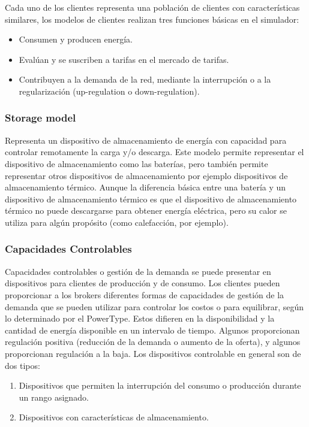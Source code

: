 Cada uno de los clientes representa una población de clientes con características similares, los modelos de clientes realizan tres funciones básicas en el simulador:

\begin{itemize}
	\item Consumen y producen energía.
	\item Evalúan y se suscriben  a tarifas en el mercado de tarifas.
	\item Contribuyen a la demanda de la red, mediante la interrupción o  a la regularización (up-regulation o down-regulation).	
\end{itemize}

\subsubsection{Storage model}
Representa un dispositivo de almacenamiento de energía con capacidad para controlar remotamente la carga y/o descarga. Este modelo permite representar el dispositivo de almacenamiento como las baterías, pero también permite representar otros dispositivos de almacenamiento por ejemplo dispositivos de almacenamiento térmico. Aunque la diferencia básica entre una batería y un dispositivo de almacenamiento térmico es que el dispositivo de almacenamiento térmico no puede descargarse para obtener energía eléctrica, pero su calor se utiliza para algún propósito (como calefacción, por ejemplo).

\subsubsection{Capacidades Controlables}
Capacidades controlables o gestión de la demanda se puede presentar en dispositivos para clientes de producción y de consumo. 
Los clientes pueden proporcionar a los brokers diferentes formas de capacidades de gestión de la demanda que se pueden utilizar para controlar los costos o para equilibrar, según lo determinado por el PowerType. Estos difieren en la disponibilidad y la cantidad de energía disponible en un intervalo de tiempo. Algunos proporcionan regulación positiva (reducción de la demanda o aumento de la oferta), y algunos proporcionan regulación a la baja. Los dispositivos controlable en general son de dos tipos: 
\begin{enumerate}
	\item Dispositivos que permiten la interrupción del consumo o producción durante un rango asignado.
	\item Dispositivos con características de almacenamiento.
\end{enumerate}

